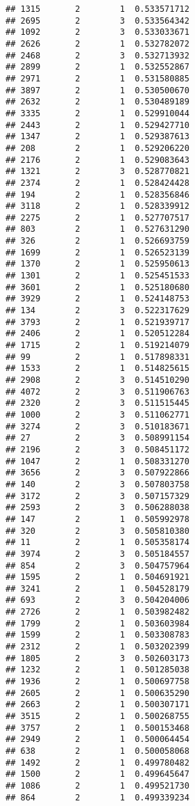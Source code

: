 \documentclass[
]{article}
\begin{document}
\begin{verbatim}
## 1315       2        1  0.533571712
## 2695       2        3  0.533564342
## 1092       2        3  0.533033671
## 2626       2        1  0.532782072
## 2468       2        3  0.532713932
## 2899       2        1  0.532552867
## 2971       2        1  0.531580885
## 3897       2        1  0.530500670
## 2632       2        1  0.530489189
## 3335       2        1  0.529910044
## 2443       2        1  0.529427710
## 1347       2        1  0.529387613
## 208        2        1  0.529206220
## 2176       2        1  0.529083643
## 1321       2        3  0.528770821
## 2374       2        1  0.528424428
## 194        2        1  0.528356846
## 3118       2        1  0.528339912
## 2275       2        1  0.527707517
## 803        2        1  0.527631290
## 326        2        1  0.526693759
## 1699       2        1  0.526523139
## 1370       2        1  0.525950613
## 1301       2        1  0.525451533
## 3601       2        1  0.525180680
## 3929       2        1  0.524148753
## 134        2        3  0.522317629
## 3793       2        1  0.521939717
## 2406       2        1  0.520512284
## 1715       2        1  0.519214079
## 99         2        1  0.517898331
## 1533       2        1  0.514825615
## 2908       2        3  0.514510290
## 4072       2        3  0.511906763
## 2320       2        3  0.511515445
## 1000       2        3  0.511062771
## 3274       2        3  0.510183671
## 27         2        3  0.508991154
## 2196       2        3  0.508451172
## 1047       2        1  0.508331270
## 3656       2        3  0.507922866
## 140        2        3  0.507803758
## 3172       2        3  0.507157329
## 2593       2        3  0.506288038
## 147        2        1  0.505992978
## 320        2        3  0.505810380
## 11         2        1  0.505358174
## 3974       2        3  0.505184557
## 854        2        3  0.504757964
## 1595       2        1  0.504691921
## 3241       2        1  0.504528179
## 693        2        3  0.504204006
## 2726       2        1  0.503982482
## 1799       2        1  0.503603984
## 1599       2        1  0.503308783
## 2312       2        1  0.503202399
## 1805       2        3  0.502603173
## 1232       2        1  0.501285038
## 1936       2        1  0.500697758
## 2605       2        1  0.500635290
## 2663       2        1  0.500307171
## 3515       2        1  0.500268755
## 3757       2        1  0.500153468
## 2949       2        1  0.500064454
## 638        2        1  0.500058068
## 1492       2        1  0.499780482
## 1500       2        1  0.499645647
## 1086       2        1  0.499521730
## 864        2        1  0.499339234

\end{verbatim}
\end{document}

